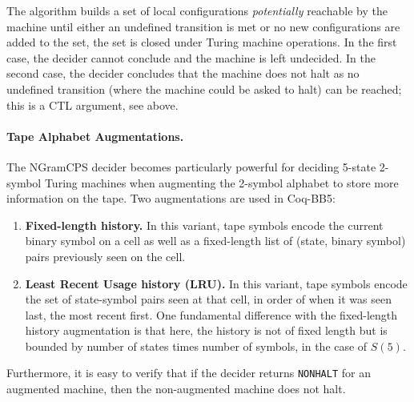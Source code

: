 \documentclass[sigconf,screen]{acmart}
\theoremstyle{definition} %
\numberwithin{equation}{section}
\theoremstyle{definition} %
\newcommand{\NONHALT}{\texttt{NONHALT}\xspace}
\newcommand{\CoqBB}{Coq-BB5\xspace}
\begin{document}
The algorithm builds a set of local configurations \textit{potentially} reachable by the machine until either an undefined transition is met or no new configurations are added to the set, \ie the set is closed under Turing machine operations. In the first case, the decider cannot conclude and the machine is left undecided. In the second case, the decider concludes that the machine does not halt as no undefined transition (\ie where the machine could be asked to halt) can be reached; this is a CTL argument, see above.

\paragraph{Tape Alphabet Augmentations.} The NGramCPS decider becomes particularly powerful for deciding 5-state 2-symbol Turing machines when augmenting the 2-symbol alphabet to store more information on the tape. Two augmentations are used in \CoqBB:
\begin{enumerate}
    \item \textbf{Fixed-length history.} In this variant, tape symbols encode the current binary symbol on a cell as well as a fixed-length list of (state, binary symbol) pairs previously seen on the cell.
    \item \textbf{Least Recent Usage history (LRU).} In this variant, tape symbols encode the set of state-symbol pairs seen at that cell, in order of when it was seen last, the most recent first. One fundamental difference with the fixed-length history augmentation is that here, the history is not of fixed length but is bounded by number of states times number of symbols,  in the case of $S(5)$.
\end{enumerate}
Furthermore, it is easy to verify that if the decider returns \NONHALT for an augmented machine, then the non-augmented machine does not halt.
\end{document}
